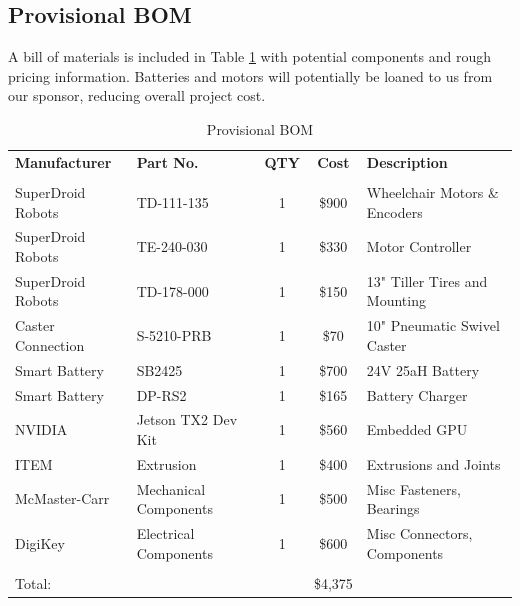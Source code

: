 \documentclass[12pt]{extarticle}
\begin{document}
\subsection{Provisional BOM}
A bill of materials is included in Table \ref{Tab:provisional_bom} with potential components and rough pricing information. Batteries and motors will potentially be loaned to us from our sponsor, reducing overall project cost.
\begin{table}[H]
\centering
\def\arraystretch{1.1}
\caption{Provisional BOM}
\label{Tab:provisional_bom}
\begin{tabular}{ llccl }
\hline

    \sffamily\textbf{Manufacturer} & \sffamily\textbf{Part No.} & \sffamily\textbf{QTY} & \sffamily\textbf{Cost} & \sffamily\textbf{Description}\\

    \\[-.8ex]
    SuperDroid Robots & TD-111-135 & 1 & \$900 & Wheelchair Motors \& Encoders \\
	SuperDroid Robots & TE-240-030 & 1 & \$330 & Motor Controller \\
	SuperDroid Robots & TD-178-000 & 1 & \$150 & 13" Tiller Tires and Mounting \\
	Caster Connection & S-5210-PRB & 1 & \$70 & 10" Pneumatic Swivel Caster \\
	Smart Battery & SB2425 & 1 & \$700 & 24V 25aH Battery \\
    Smart Battery & DP-RS2 & 1 & \$165 & Battery Charger \\
    NVIDIA & Jetson TX2 Dev Kit & 1 & \$560 &  Embedded GPU \\
	ITEM & Extrusion & 1 & \$400 & Extrusions and Joints \\
	McMaster-Carr & Mechanical Components & 1 & \$500 & Misc Fasteners, Bearings \\
	DigiKey & Electrical Components & 1 & \$600 & Misc Connectors, Components \\[.5ex]
	\hline 
	\\[-2ex]
	Total: &&& \$4,375 &\\
	
    
\end{tabular}
\end{table}
\end{document}
